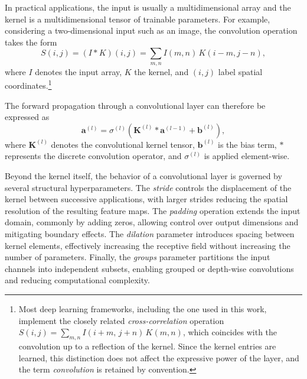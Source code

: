 In practical applications, the input is usually a multidimensional array and the kernel is a multidimensional tensor of trainable parameters. For example, considering a two-dimensional input such as an image, the convolution operation takes the form
\begin{equation}
    S(i,j) = (I * K)(i,j) = \sum_{m,n} I(m,n)\,K(i - m, j - n),
\end{equation}
where $I$ denotes the input array, $K$ the kernel, and $(i,j)$ label spatial coordinates.\footnote{Most deep learning frameworks, including the one used in this work, implement the closely related \emph{cross-correlation} operation $S(i,j)=\sum_{m,n} I(i+m,\,j+n)\,K(m,n)$, which coincides with the convolution up to a reflection of the kernel. Since the kernel entries are learned, this distinction does not affect the expressive power of the layer, and the term \emph{convolution} is retained by convention.}

The forward propagation through a convolutional layer can therefore be expressed as
\begin{equation}
    \mathbf{a}^{(l)} =
    \sigma^{(l)}\!\left(
    \mathbf{K}^{(l)} * \mathbf{a}^{(l-1)} + \mathbf{b}^{(l)}
    \right),
\end{equation}
where $\mathbf{K}^{(l)}$ denotes the convolutional kernel tensor, $\mathbf{b}^{(l)}$ is the bias term, $*$ represents the discrete convolution operator, and $\sigma^{(l)}$ is applied element-wise.

Beyond the kernel itself, the behavior of a convolutional layer is governed by several structural hyperparameters. The \emph{stride} controls the displacement of the kernel between successive applications, with larger strides reducing the spatial resolution of the resulting feature maps. The \emph{padding} operation extends the input domain, commonly by adding zeros, allowing control over output dimensions and mitigating boundary effects. The \emph{dilation} parameter introduces spacing between kernel elements, effectively increasing the receptive field without increasing the number of parameters. Finally, the \emph{groups} parameter partitions the input channels into independent subsets, enabling grouped or depth-wise convolutions and reducing computational complexity.


